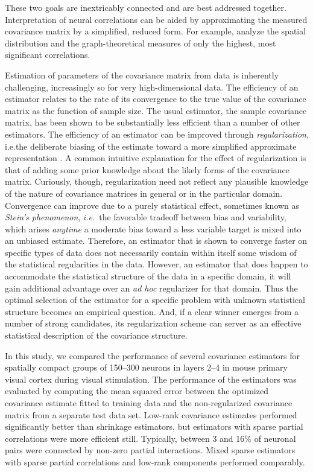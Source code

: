 These two goals are inextricably connected and are best addressed together. Interpretation of neural correlations can be aided by approximating the measured covariance matrix by a simplified, reduced form.  For example, \cite{Malmersjo:2013} analyze the spatial distribution and the graph-theoretical measures of only the highest, most significant correlations.

Estimation of parameters of the covariance matrix from data is inherently challenging, increasingly so for very high-dimensional data. The efficiency of an estimator relates to the rate of its convergence to the true value of the covariance matrix as the function of sample size. The usual estimator, the sample covariance matrix, has been shown to be substantially less efficient than a number of other estimators.  The efficiency of an estimator can be improved through \emph{regularization}, i.e.\;the deliberate biasing of the estimate toward a more simplified approximate representation \citep{Bickel:2006,Bickel:2008,Ledoit:2004,Schafer:2005}. A common intuitive explanation for the effect of regularization is that of adding some prior knowledge about the likely forms of the covariance matrix. Curiously, though, regularization need not reflect any plausible knowledge of the nature of covariance matrices in general or in the particular domain. Convergence can improve due to a purely statistical effect, sometimes known as \emph{Stein's phenomenon}, \emph{i.e.}~the favorable tradeoff between bias and variability, which arises \emph{anytime} a moderate bias toward a less variable target is mixed into an unbiased estimate.  Therefore, an estimator that is shown to converge faster on specific types of data does not necessarily contain within itself some wisdom of the statistical regularities in the data.  However, an estimator that does happen to accommodate the statistical structure of the data in a specific domain, it will gain additional advantage over an \emph{ad hoc} regularizer for that domain. Thus the optimal selection of the estimator for a specific problem with unknown statistical structure becomes an empirical question. And, if a clear winner emerges from a number of strong candidates, its regularization scheme can server as an effective statistical description of the covariance structure. 

In this study, we compared the performance of several covariance estimators for spatially compact groups of 150--300 neurons in layers 2--4 in mouse primary visual cortex during visual stimulation.   The performance of the estimators was evaluated by computing the mean squared error between the optimized covariance estimate fitted to training data and the non-regularized covariance matrix from a separate test data set.  Low-rank covariance estimates performed significantly better than shrinkage estimators, but estimators with sparse partial correlations were more efficient still. Typically, between 3 and 16\% of neuronal pairs were connected by non-zero partial interactions.  Mixed sparse estimators with sparse partial correlations and low-rank components performed comparably. 

